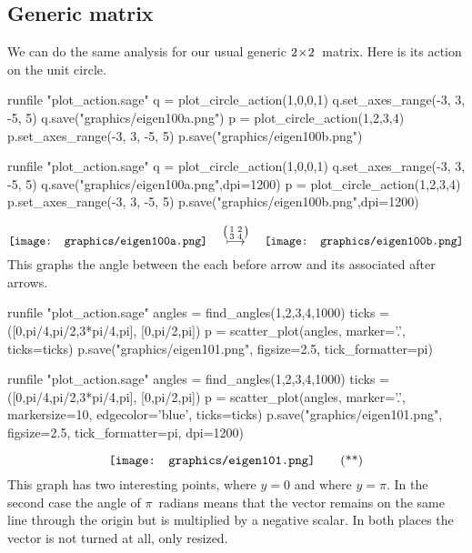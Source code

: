 \subsection{Generic matrix}
We can do the same analysis for our usual generic $2 \! \times \! 2$~matrix.
Here is its action on the unit circle.
\begin{sageoutput}[d,0,4;d,5,7]
runfile "plot_action.sage"
q = plot_circle_action(1,0,0,1) 
q.set_axes_range(-3, 3, -5, 5) 
q.save("graphics/eigen100a.png")
p = plot_circle_action(1,2,3,4) 
p.set_axes_range(-3, 3, -5, 5) 
p.save("graphics/eigen100b.png")
\end{sageoutput}
\begin{sagesilent}
runfile "plot_action.sage"
q = plot_circle_action(1,0,0,1) 
q.set_axes_range(-3, 3, -5, 5) 
q.save("graphics/eigen100a.png",dpi=1200)
p = plot_circle_action(1,2,3,4) 
p.set_axes_range(-3, 3, -5, 5) 
p.save("graphics/eigen100b.png",dpi=1200)
\end{sagesilent}
\begin{equation*}
  \vcenteredhbox{\texttt{[image: graphics/eigen100a.png]}}
  \quad\mapsunder{\big (\begin{smallmatrix} 1 &2 \\ 3 &4 \end{smallmatrix}\big )}\quad
  \vcenteredhbox{\texttt{[image: graphics/eigen100b.png]}}
\end{equation*}
This graphs the angle between the each before arrow and its associated after
arrows.
\begin{sageoutput}[d,0,1]
runfile "plot_action.sage"  
angles = find_angles(1,2,3,4,1000)
ticks = ([0,pi/4,pi/2,3*pi/4,pi], [0,pi/2,pi])
p = scatter_plot(angles, marker='.', ticks=ticks)
p.save("graphics/eigen101.png", figsize=2.5, tick_formatter=pi)
\end{sageoutput}
\begin{sagesilent}
runfile "plot_action.sage"  
angles = find_angles(1,2,3,4,1000)
ticks = ([0,pi/4,pi/2,3*pi/4,pi], [0,pi/2,pi])
p = scatter_plot(angles, marker='.', markersize=10, edgecolor='blue', ticks=ticks)
p.save("graphics/eigen101.png", figsize=2.5, tick_formatter=pi, dpi=1200)
\end{sagesilent}
\begin{equation*}
  \vcenteredhbox{\texttt{[image: graphics/eigen101.png]}}
  \tag{**}
\end{equation*}
This graph has two interesting points, where $y=0$ and where 
$y=\pi$.
In the second case
the angle of $\pi$~radians means that the vector remains on the
same line through the origin but is multiplied by a negative scalar.
In both places the vector is not turned at all, only resized.


